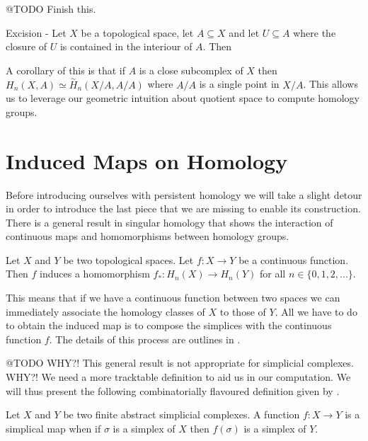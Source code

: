 

 @TODO Finish this.

\begin{thm} Excision - Let $X$ be a topological space, let $A \subseteq X$ and let $U \subseteq A$ where the closure of $U$ is contained in the interiour of $A$. Then   \end{thm}


A corollary of this is that if $A$ is a close subcomplex of $X$ then $H_n(X, A) \simeq \overset{\sim}{H}_n(X/A, A/A)$ where $A/A$ is a single point in $X/A$. This allows us to leverage our geometric intuition about quotient space to compute homology groups.

\section{Induced Maps on Homology}

Before introducing ourselves with persistent homology we will take a slight detour in order to introduce the last piece that we are missing to enable its construction. There is a general result in singular homology that shows the interaction of continuous maps and homomorphisms between homology groups.

\begin{defn} Let $X$ and $Y$ be two topological spaces. Let $f: X \to Y$ be a continuous function. Then $f$ induces a homomorphism $f_*: H_n(X) \to H_n(Y)$ for all $n \in \{0, 1, 2, ...\}$. \end{defn}

This means that if we have a continuous function between two spaces we can immediately associate the homology classes of $X$ to those of $Y$. All we have to do to obtain the induced map is to compose the simplices with the continuous function $f$. The details of this process are outlines in \cite{algebraic-topology}.


 @TODO WHY?!
This general result is not appropriate for simplicial complexes. WHY?! We need a more tracktable definition to aid us in our computation. We will thus present the following combinatorially flavoured definition given by \cite{combinatorial-algebraic-topology}.


\begin{defn} Let $X$ and $Y$ be two finite abstract simplicial complexes. A function $f: X \to Y$ is a simplical map when if $\sigma$ is a simplex of $X$ then $f(\sigma)$ is a simplex of $Y$. \end{defn}

